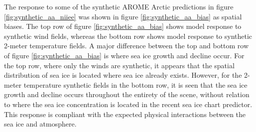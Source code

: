 \documentclass[../main/thesis]{subfiles}
\begin{document}
The response to some of the synthetic AROME Arctic predictions in figure \ref{fig:synthetic_aa_niiee} was shown in figure \ref{fig:synthetic_aa_bias} as spatial biases. The top row of figure \ref{fig:synthetic_aa_bias} shows model response to synthetic wind fields, whereas the bottom row shows model response to synthetic 2-meter temperature fields. A major difference between the top and bottom row of figure \ref{fig:synthetic_aa_bias} is where sea ice growth and decline occur. For the top row, where only the winds are synthetic, it appears that the spatial distribution of sea ice is located where sea ice already exists. However, for the 2-meter temperature synthetic fields in the bottom row, it is seen that the sea ice growth and decline occurs throughout the entirety of the scene, without relation to where the sea ice concentration is located in the recent sea ice chart predictor. This response is compliant with the expected physical interactions between the sea ice and atmosphere. 
\end{document}
